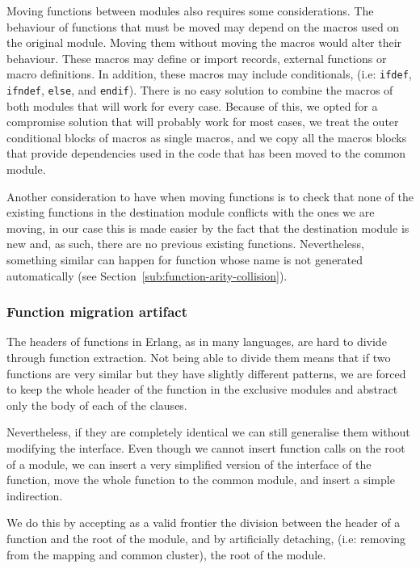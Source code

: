 Moving functions between modules also requires some considerations.
The behaviour of functions that must be moved may depend on the macros
used on the original module. Moving them without moving the macros
would alter their behaviour. These macros may define or import records,
external functions or macro definitions. In addition, these macros
may include conditionals, (i.e: \texttt{ifdef}, \texttt{ifndef}, \texttt{else},
and \texttt{endif}). There is no easy solution to combine the macros
of both modules that will work for every case. Because of this, we
opted for a compromise solution that will probably work for most cases,
we treat the outer conditional blocks of macros as single macros,
and we copy all the macros blocks that provide dependencies used in
the code that has been moved to the common module.

Another consideration to have when moving functions is to check that
none of the existing functions in the destination module conflicts
with the ones we are moving, in our case this is made easier by the
fact that the destination module is new and, as such, there are no
previous existing functions. Nevertheless, something similar can happen
for function whose name is not generated automatically (see Section~\ref{sub:function-arity-collision}).


\subsubsection{Function migration artifact\label{sub:function-migration-artifact}}

The headers of functions in Erlang, as in many languages, are hard to
divide through function extraction. Not being able to divide them
means that if two functions are very similar but they have slightly
different patterns, we are forced to keep the whole header of the
function in the exclusive modules and abstract only the body of each
of the clauses.

Nevertheless, if they are completely identical we can still generalise
them without modifying the interface. Even though we cannot insert
function calls on the root of a module, we can insert a very simplified
version of the interface of the function, move the whole function to the
common module, and insert a simple indirection.

We do this by accepting as a valid frontier the division between the
header of a function and the root of the module, and by artificially
detaching, (i.e: removing from the mapping and common cluster), the
root of the module.

